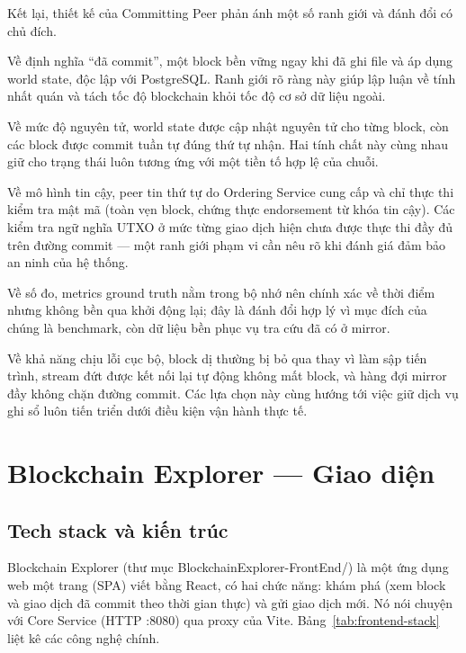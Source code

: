 Kết lại, thiết kế của Committing Peer phản ánh một số ranh giới và đánh đổi
có chủ đích.

Về định nghĩa ``đã commit'', một block bền vững ngay khi đã ghi file và áp
dụng world state, độc lập với PostgreSQL. Ranh giới rõ ràng này giúp lập luận
về tính nhất quán và tách tốc độ blockchain khỏi tốc độ cơ sở dữ liệu ngoài.

Về mức độ nguyên tử, world state được cập nhật nguyên tử cho từng block, còn
các block được commit tuần tự đúng thứ tự nhận. Hai tính chất này cùng nhau
giữ cho trạng thái luôn tương ứng với một tiền tố hợp lệ của chuỗi.

Về mô hình tin cậy, peer tin thứ tự do Ordering Service cung cấp và chỉ thực
thi kiểm tra mật mã (toàn vẹn block, chứng thực endorsement từ khóa tin cậy).
Các kiểm tra ngữ nghĩa UTXO ở mức từng giao dịch hiện chưa được thực thi đầy
đủ trên đường commit --- một ranh giới phạm vi cần nêu rõ khi đánh giá đảm
bảo an ninh của hệ thống.

Về số đo, metrics ground truth nằm trong bộ nhớ nên chính xác về thời điểm
nhưng không bền qua khởi động lại; đây là đánh đổi hợp lý vì mục đích của
chúng là benchmark, còn dữ liệu bền phục vụ tra cứu đã có ở mirror.

Về khả năng chịu lỗi cục bộ, block dị thường bị bỏ qua thay vì làm sập tiến
trình, stream đứt được kết nối lại tự động không mất block, và hàng đợi
mirror đầy không chặn đường commit. Các lựa chọn này cùng hướng tới việc giữ
dịch vụ ghi sổ luôn tiến triển dưới điều kiện vận hành thực tế.


\section{Blockchain Explorer --- Giao diện}
\label{sec:explorer}

\subsection{Tech stack và kiến trúc}

Blockchain Explorer (thư mục BlockchainExplorer-FrontEnd/) là một ứng dụng
web một trang (SPA) viết bằng React, có hai chức năng: khám phá (xem block và
giao dịch đã commit theo thời gian thực) và gửi giao dịch mới. Nó nói chuyện
với Core Service (HTTP :8080) qua proxy của Vite. Bảng~\ref{tab:frontend-stack}
liệt kê các công nghệ chính.

